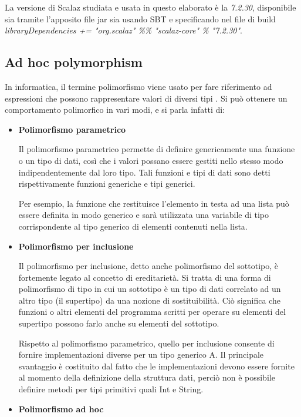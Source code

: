 La versione di Scalaz studiata e usata in questo elaborato è la \textit{7.2.30}, disponibile sia tramite l'apposito file jar sia usando SBT e specificando nel file di build \textit{libraryDependencies += "org.scalaz" \%\% "scalaz-core" \% "7.2.30"}.

\subsection{Ad hoc polymorphism}

In informatica, il termine polimorfismo viene usato per fare riferimento ad espressioni che possono rappresentare valori di diversi tipi \cite{Polymorphism}. Si può ottenere un comportamento polimorfico in vari modi, e si parla infatti di:

\begin{itemize}
\item \textbf{Polimorfismo parametrico}

Il polimorfismo parametrico permette di definire genericamente una funzione o un tipo di dati, così che i valori possano essere gestiti nello stesso modo indipendentemente dal loro tipo. Tali funzioni e tipi di dati sono detti rispettivamente funzioni generiche e tipi generici.

Per esempio, la funzione che restituisce l'elemento in testa ad una lista può essere definita in modo generico e sarà utilizzata una variabile di tipo corrispondente al tipo generico di elementi contenuti nella lista.


\item \textbf{Polimorfismo per inclusione}

Il polimorfismo per inclusione, detto anche polimorfismo del sottotipo, è fortemente legato al concetto di ereditarietà. Si tratta di una forma di polimorfismo di tipo in cui un sottotipo è un tipo di dati correlato ad un altro tipo (il supertipo) da una nozione di sostituibilità. Ciò significa che funzioni o altri elementi del programma scritti per operare su elementi del supertipo possono farlo anche su elementi del sottotipo.

Rispetto al polimorfismo parametrico, quello per inclusione consente di fornire implementazioni diverse per un tipo generico A. Il principale svantaggio è costituito dal fatto che le implementazioni devono essere fornite al momento della definizione della struttura dati, perciò non è possibile definire metodi per tipi primitivi quali Int e String.


\item \textbf{Polimorfismo ad hoc}


\end{itemize}
